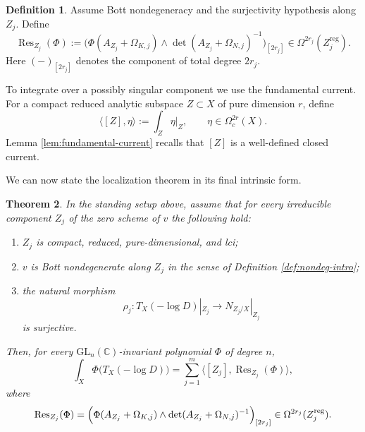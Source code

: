 \documentclass[12pt,a4paper,dvipsnames,x11names]{amsart}
\numberwithin{equation}{section}
\theoremstyle{plain}
\newtheorem{theorem}{Theorem}[section]
\theoremstyle{definition}
\newtheorem{definition}[theorem]{Definition}
\theoremstyle{remark}
\newcommand{\CC}{\mathbb C}
\newcommand{\GL}{\mathrm{GL}}
\newcommand{\reg}{\mathrm{reg}}
\begin{document}
\begin{definition} \label{def:resform-intro}
Assume Bott nondegeneracy and the surjectivity hypothesis along $Z_j$. Define
\begin{equation}\label{eq:Resform-intro}
\operatorname{Res}_{Z_j}(\Phi)
:=
\Big(\Phi(A_{Z_j}+\Omega_{K,j})\wedge \det(A_{Z_j}+\Omega_{N,j})^{-1}\Big)_{[2r_j]}
\in \Omega^{2r_j}(Z_j^\reg).
\end{equation}
Here $(-)_{[2r_j]}$ denotes the component of total degree $2r_j$.
\end{definition}

To integrate over a possibly singular component we use the fundamental current. For a compact reduced analytic subspace $Z\subset X$ of pure dimension $r$, define
\begin{equation}\label{eq:frown-intro}
\langle [Z],\eta\rangle:=\int_{Z}\eta|_{Z },
\qquad \eta\in \Omega_c^{2r}(X).
\end{equation}
Lemma \ref{lem:fundamental-current} recalls that $[Z]$ is a well-defined closed current.

We can now state the localization theorem in its final intrinsic form.

\begin{theorem}\label{thm:main}
In the standing setup above, assume that for every irreducible component $Z_j$ of the zero scheme of $v$ the following hold:
\begin{enumerate} 
\item $Z_j$ is compact, reduced, pure-dimensional, and lci;
\item $v$ is Bott nondegenerate along $Z_j$ in the sense of Definition \ref{def:nondeg-intro};
\item the natural morphism
$$
\rho_j:T_X(-\log D)|_{Z_j}\to N_{Z_j/X}|_{Z_j}
$$
is surjective.
\end{enumerate}
Then, for every $\GL_n(\CC)$-invariant polynomial $\Phi$ of degree $n$,
\begin{equation}\label{eq:main}
\int_X \Phi\bigl(T_X(-\log D)\bigr)
=
\sum_{j=1}^m \langle [Z_j],\operatorname{Res}_{Z_j}(\Phi)\rangle,
\end{equation}
where
$$
\operatorname{Res}_{Z_j}(\Phi)
=
\Bigl(\Phi(A_{Z_j}+\Omega_{K,j})\wedge \det(A_{Z_j}+\Omega_{N,j})^{-1}\Bigr)_{[2r_j]}
\in \Omega^{2r_j}(Z_j^{\reg}).
$$
\end{theorem}
\end{document}
